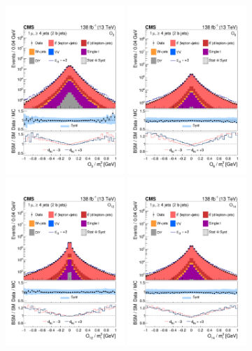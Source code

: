 \begin{figure}
    \centering
    \includegraphics[width=0.4\textwidth]{figure/Figure_002-a.pdf}
    \includegraphics[width=0.4\textwidth]{figure/Figure_002-b.pdf}
    \includegraphics[width=0.4\textwidth]{figure/Figure_002-c.pdf}
    \includegraphics[width=0.4\textwidth]{figure/Figure_002-d.pdf}

\end{figure}
